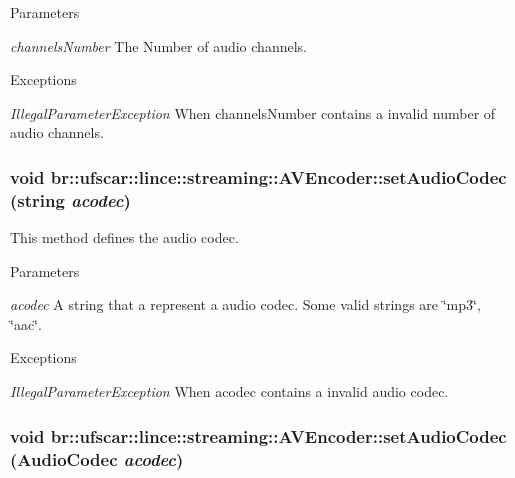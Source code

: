 \begin{DoxyParams}{Parameters}
\item[{\em channelsNumber}]The Number of audio channels. \end{DoxyParams}

\begin{DoxyExceptions}{Exceptions}
\item[{\em IllegalParameterException}]When channelsNumber contains a invalid number of audio channels. \end{DoxyExceptions}
\hypertarget{classbr_1_1ufscar_1_1lince_1_1streaming_1_1AVEncoder_ab98f7e542c0d37bfef68fc5d224dc3cf}{
\subsubsection[{setAudioCodec}]{\setlength{\rightskip}{0pt plus 5cm}void br::ufscar::lince::streaming::AVEncoder::setAudioCodec (string {\em acodec})}}
\label{classbr_1_1ufscar_1_1lince_1_1streaming_1_1AVEncoder_ab98f7e542c0d37bfef68fc5d224dc3cf}


This method defines the audio codec. 


\begin{DoxyParams}{Parameters}
\item[{\em acodec}]A string that a represent a audio codec. Some valid strings are \char`\"{}mp3\char`\"{}, \char`\"{}aac\char`\"{}. \end{DoxyParams}

\begin{DoxyExceptions}{Exceptions}
\item[{\em IllegalParameterException}]When acodec contains a invalid audio codec. \end{DoxyExceptions}
\hypertarget{classbr_1_1ufscar_1_1lince_1_1streaming_1_1AVEncoder_a5049d529b8005043fdbbbd30b7771662}{
\subsubsection[{setAudioCodec}]{\setlength{\rightskip}{0pt plus 5cm}void br::ufscar::lince::streaming::AVEncoder::setAudioCodec ({\bf AudioCodec} {\em acodec})}}
\label{classbr_1_1ufscar_1_1lince_1_1streaming_1_1AVEncoder_a5049d529b8005043fdbbbd30b7771662}


